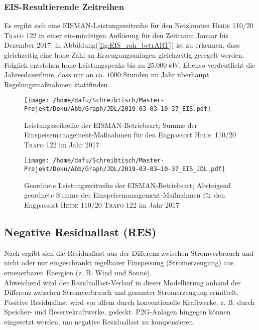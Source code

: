 \documentclass[onecolumn,10pt,titlepage]{article}
\begin{document}
\subsubsection{EIS-Resultierende Zeitreihen}

Es ergibt sich eine EISMAN-Leistungszeitreihe für den Netzknoten \textsc{Heide 110/20 Trafo 122} in einer ein-minütigen  Auflösung für den Zeitraum Januar bis Dezember 2017. in Abbildung(\ref{fig:EIS_roh_betrART}) ist zu erkennen, dass gleichzeitig eine hohe Zahl an Erzeugungsanlagen gleichzeitig geregelt werden. Folglich entstehen hohe Leistungspeaks bis zu $25.000 ~kW$. Ebenso verdeutlicht die Jahresdauerlinie, dass nur an ca. $1000$ Stunden im Jahr überhaupt Regelungsmaßnahmen stattfinden.\\

\begin{figure}[H]
	\centering
	\begin{minipage}[t]{0.49\textwidth}
		\texttt{[image: /home/dafu/Schreibtisch/Master-Projekt/Doku/Abb/Graph/JDL/2019-03-03--10-37\_EIS.pdf]}
		
		\caption[Leistungszeitreihe der EISMAN-Betriebsart]{Leistungszeitreihe der EISMAN-Betriebsart; Summe der Einspeisemanagement-Maßnahmen für den Engpassort \textsc{Heide 110/20 Trafo 122} im Jahr 2017}
		\label{fig:EIS_roh_betrART} 
	\end{minipage}
	\hfill
	\begin{minipage}[t]{0.49\textwidth}
		\texttt{[image: /home/dafu/Schreibtisch/Master-Projekt/Doku/Abb/Graph/JDL/2019-03-03--10-37\_EIS\_JDL.pdf]}
		\caption[Geordnete Leistungszeitreihe der EISMAN-Betriebsart]{Geordnete Leistungszeitreihe der EISMAN-Betriebsart; Absteigend geordnete Summe der Einspeisemanagement-Maßnahmen für den Engpassort \textsc{Heide 110/20 Trafo 122} im Jahr 2017}
		\label{fig:EIS_JDL_betrART} 
	\end{minipage}
\end{figure}

%	

\subsection{Negative Residuallast (RES)}
Nach \cite{Schiffer.2019} ergibt sich die Residuallast aus der Differenz zwischen Stromverbrauch und nicht oder nur eingeschränkt regelbarer Einspeisung (Stromerzeugung) aus erneuerbaren Energien (z. B. Wind und Sonne). \\
Abweichend wird der Residuallast-Verlauf in dieser Modellierung anhand der Differenz zwischen Stromverbrauch und gesamter Stromerzeugung ermittelt. Positive Residuallast wird vor allem durch konventionelle Kraftwerke, z. B. durch Speicher- und Reservekraftwerke, gedeckt.\cite{Schiffer.2019} P2G-Anlagen hingegen können eingesetzt werden, um negative Residuallast zu kompensieren.
\end{document}
